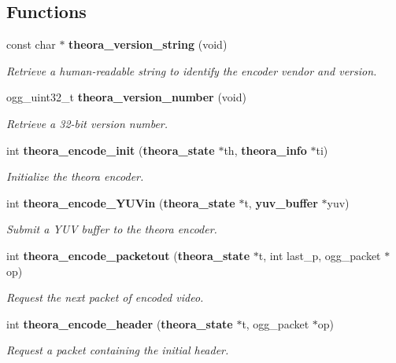 \subsection*{Functions}
\begin{CompactItemize}
\item 
const char $\ast$ {\bf theora\_\-version\_\-string} (void)
\begin{CompactList}\small\item\em Retrieve a human-readable string to identify the encoder vendor and version. \item\end{CompactList}\item 
ogg\_\-uint32\_\-t {\bf theora\_\-version\_\-number} (void)
\begin{CompactList}\small\item\em Retrieve a 32-bit version number. \item\end{CompactList}\item 
int {\bf theora\_\-encode\_\-init} ({\bf theora\_\-state} $\ast$th, {\bf theora\_\-info} $\ast$ti)
\begin{CompactList}\small\item\em Initialize the theora encoder. \item\end{CompactList}\item 
int {\bf theora\_\-encode\_\-YUVin} ({\bf theora\_\-state} $\ast$t, {\bf yuv\_\-buffer} $\ast$yuv)
\begin{CompactList}\small\item\em Submit a YUV buffer to the theora encoder. \item\end{CompactList}\item 
int {\bf theora\_\-encode\_\-packetout} ({\bf theora\_\-state} $\ast$t, int last\_\-p, ogg\_\-packet $\ast$op)
\begin{CompactList}\small\item\em Request the next packet of encoded video. \item\end{CompactList}\item 
int {\bf theora\_\-encode\_\-header} ({\bf theora\_\-state} $\ast$t, ogg\_\-packet $\ast$op)
\begin{CompactList}\small\item\em Request a packet containing the initial header. \item\end{CompactList}\item 

\end{CompactItemize}
